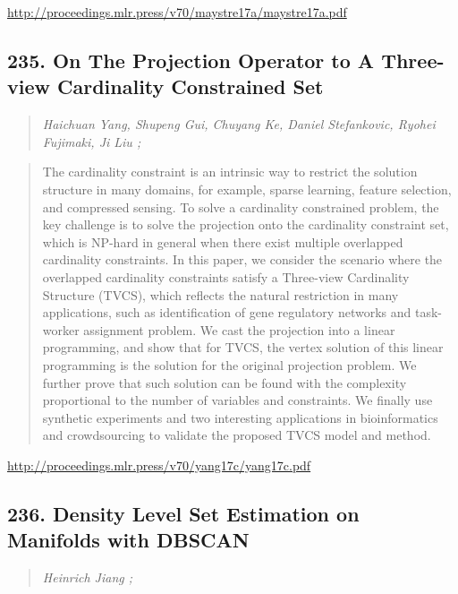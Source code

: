 \documentclass{article}
\begin{document}
\href{http://proceedings.mlr.press/v70/maystre17a/maystre17a.pdf}{http://proceedings.mlr.press/v70/maystre17a/maystre17a.pdf}

\subsection{235. On The Projection Operator to A Three-view Cardinality Constrained Set}

\begin{quote}
\footnotesize{\textit{Haichuan Yang, Shupeng Gui, Chuyang Ke, Daniel Stefankovic, Ryohei Fujimaki, Ji Liu ;}}

\end{quote}

\begin{quote}
    The cardinality constraint is an intrinsic way to restrict the solution structure in many domains, for example, sparse learning, feature selection, and compressed sensing. To solve a cardinality constrained problem, the key challenge is to solve the projection onto the cardinality constraint set, which is NP-hard in general when there exist multiple overlapped cardinality constraints. In this paper, we consider the scenario where the overlapped cardinality constraints satisfy a Three-view Cardinality Structure (TVCS), which reflects the natural restriction in many applications, such as identification of gene regulatory networks and task-worker assignment problem. We cast the projection into a linear programming, and show that for TVCS, the vertex solution of this linear programming is the solution for the original projection problem. We further prove that such solution can be found with the complexity proportional to the number of variables and constraints. We finally use synthetic experiments and two interesting applications in bioinformatics and crowdsourcing to validate the proposed TVCS model and method.  
\end{quote}

\href{http://proceedings.mlr.press/v70/yang17c/yang17c.pdf}{http://proceedings.mlr.press/v70/yang17c/yang17c.pdf}

\subsection{236. Density Level Set Estimation on Manifolds with DBSCAN}

\begin{quote}
\footnotesize{\textit{Heinrich Jiang ;}}

\end{quote}
\end{document}
